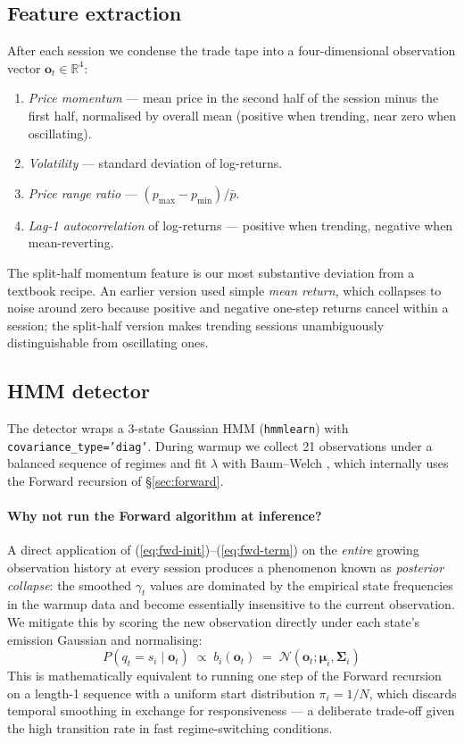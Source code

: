 \documentclass[11pt,a4paper]{article}
\begin{document}
\subsection{Feature extraction}\label{sec:features}
After each session we condense the trade tape into a four-dimensional
observation vector $\mathbf{o}_t \in \mathbb{R}^4$:
\begin{enumerate}[leftmargin=0.7cm,itemsep=0ex]
    \item \emph{Price momentum} --- mean price in the second half of the
    session minus the first half, normalised by overall mean (positive when
    trending, near zero when oscillating).
    \item \emph{Volatility} --- standard deviation of log-returns.
    \item \emph{Price range ratio} --- $(p_{\max} - p_{\min}) / \bar{p}$.
    \item \emph{Lag-1 autocorrelation} of log-returns --- positive when
    trending, negative when mean-reverting.
\end{enumerate}
The split-half momentum feature is our most substantive deviation from a
textbook recipe. An earlier version used simple \emph{mean return}, which
collapses to noise around zero because positive and negative one-step returns
cancel within a session; the split-half version makes trending sessions
unambiguously distinguishable from oscillating ones.

\subsection{HMM detector}\label{sec:hmm-impl}
The detector wraps a 3-state Gaussian HMM (\texttt{hmmlearn})
with \texttt{covariance\_type='diag'}. During warmup we collect 21
observations under a balanced sequence of regimes and fit $\lambda$ with
Baum--Welch \cite{baum1970maximization}, which internally uses the Forward
recursion of \S\ref{sec:forward}.

\paragraph{Why not run the Forward algorithm at inference?}
A direct application of (\ref{eq:fwd-init})--(\ref{eq:fwd-term}) on the
\emph{entire} growing observation history at every session produces a
phenomenon known as \emph{posterior collapse}: the smoothed
$\gamma_t$ values are dominated by the empirical state frequencies in the
warmup data and become essentially insensitive to the current observation.
We mitigate this by scoring the new observation directly under each state's
emission Gaussian and normalising:
\begin{equation}\label{eq:emission-scoring}
    P(q_t\!=\!s_i \mid \mathbf{o}_t)
    \;\propto\;
    b_i(\mathbf{o}_t)
    \;=\; \mathcal{N}(\mathbf{o}_t; \boldsymbol{\mu}_i, \boldsymbol{\Sigma}_i)
\end{equation}
This is mathematically equivalent to running one step of the Forward
recursion on a length-1 sequence with a uniform start distribution
$\pi_i = 1/N$, which discards temporal smoothing in exchange for
responsiveness --- a deliberate trade-off given the high transition rate in
fast regime-switching conditions.
\end{document}
